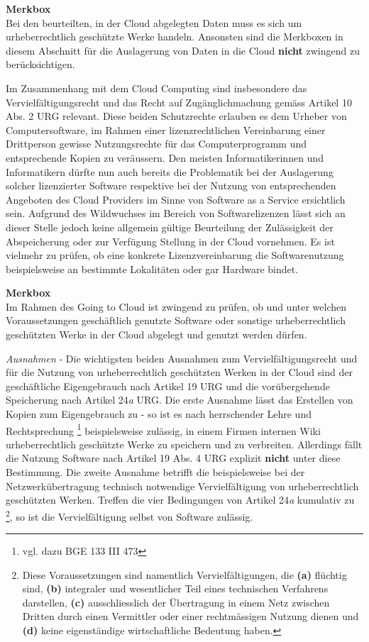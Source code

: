 \documentclass[a4paper,pointlessnumbers]{scrreprt}
\newcommand{\merkbox}[2][0.8\textwidth]{ \begin{center} \begin{tcolorbox}[enhanced, drop fuzzy midday shadow, width={#1}, opacityframe=0.5, colframe=BrickRed, colback=white] {\ECFTeenSpirit \color{BrickRed}\textbf{Merkbox} \qquad {\tiny das gilt es zu beachten}} \\  #2 \end{tcolorbox} \end{center}}
\begin{document}
\merkbox[0.7\textwidth]{Bei den beurteilten, in der Cloud abgelegten Daten muss es sich um urheberrechtlich geschützte Werke handeln. Ansonsten sind die Merkboxen in diesem Abschnitt für die Auslagerung von Daten in die Cloud \textbf{nicht} zwingend zu berücksichtigen.}

Im Zusammenhang mit dem Cloud Computing sind insbesondere das Vervielfältigungsrecht und das Recht auf Zugänglichmachung gemäss Artikel 10 Abs. 2 URG relevant. Diese beiden Schutzrechte erlauben es dem Urheber von Computersoftware, im Rahmen einer lizenzrechtlichen Vereinbarung einer Drittperson gewisse Nutzungsrechte für das Computerprogramm und entsprechende Kopien zu veräussern. Den meisten Informatikerinnen und Informatikern dürfte nun auch bereits die Problematik bei der Auslagerung solcher lizenzierter Software respektive bei der Nutzung von entsprechenden Angeboten des Cloud Providers im Sinne von Software as a Service ersichtlich sein. Aufgrund des Wildwuchses im Bereich von Softwarelizenzen lässt sich an dieser Stelle jedoch keine allgemein gültige Beurteilung der Zulässigkeit der Abspeicherung oder zur Verfügung Stellung in der Cloud vornehmen. Es ist vielmehr zu prüfen, ob eine konkrete Lizenzvereinbarung die Softwarenutzung beispielsweise an bestimmte Lokalitäten oder gar Hardware bindet. 

\merkbox[0.7\textwidth]{Im Rahmen des Going to Cloud ist zwingend zu prüfen, ob und unter welchen Voraussetzungen geschäftlich genutzte Software oder sonstige urheberrechtlich geschützten Werke in der Cloud abgelegt und genutzt werden dürfen.}

\textit{Ausnahmen} - Die wichtigsten beiden Ausnahmen zum Vervielfältigungsrecht und für die Nutzung von urheberrechtlich geschützten Werken in der Cloud sind der geschäftliche Eigengebrauch nach Artikel 19 URG und die vorübergehende Speicherung nach Artikel 24\textit{a} URG. Die erste Ausnahme lässt das Erstellen von Kopien zum Eigengebrauch zu - so ist es nach herrschender Lehre und Rechtsprechung \footnote{vgl. dazu BGE 133 III 473} beispielsweise zulässig, in einem Firmen internen Wiki urheberrechtlich geschützte Werke zu speichern und zu verbreiten. Allerdings fällt die Nutzung Software nach Artikel 19 Abs. 4 URG explizit \textbf{nicht} unter diese Bestimmung. Die zweite Ausnahme betrifft die beispielsweise bei der Netzwerkübertragung technisch notwendige Vervielfältigung von urheberrechtlich geschützten Werken. Treffen die vier Bedingungen von Artikel 24\textit{a} kumulativ zu \footnote{Diese Voraussetzungen sind namentlich Vervielfältigungen, die \textbf{(a)} flüchtig sind, \textbf{(b)} integraler und wesentlicher Teil eines technischen Verfahrens darstellen, \textbf{(c)} ausschliesslich der Übertragung in einem Netz zwischen Dritten durch einen Vermittler oder einer rechtmässigen Nutzung dienen und  \textbf{(d)} keine eigenständige wirtschaftliche Bedeutung haben.}, so ist die Vervielfältigung selbst von Software zulässig. 
\end{document}
